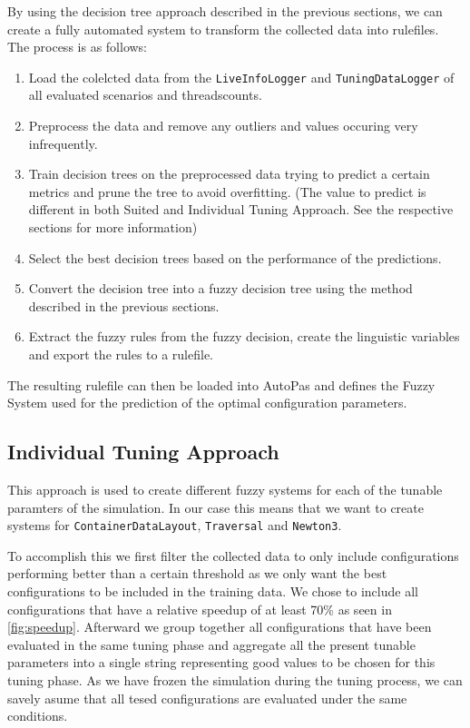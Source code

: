 By using the decision tree approach described in the previous sections, we can create a fully automated system to transform the collected data into rulefiles. The process is as follows:

\begin{enumerate}
    \item Load the colelcted data from the \texttt{LiveInfoLogger} and \texttt{TuningDataLogger} of all evaluated scenarios and threadscounts.
    \item Preprocess the data and remove any outliers and values occuring very infrequently.
    \item Train decision trees on the preprocessed data trying to predict a certain metrics and prune the tree to avoid overfitting. (The value to predict is different in both Suited and Individual Tuning Approach. See the respective sections for more information)
    \item Select the best decision trees based on the performance of the predictions.
    \item Convert the decision tree into a fuzzy decision tree using the method described in the previous sections.
    \item Extract the fuzzy rules from the fuzzy decision, create the linguistic variables and export the rules to a rulefile.
\end{enumerate}

The resulting rulefile can then be loaded into AutoPas and defines the Fuzzy System used for the prediction of the optimal configuration parameters.

\subsection{Individual Tuning Approach}

This approach is used to create different fuzzy systems for each of the tunable paramters of the simulation. In our case this means that we want to create systems for \texttt{ContainerDataLayout}, \texttt{Traversal} and \texttt{Newton3}.

To accomplish this we first filter the collected data to only include configurations performing better than a certain threshold as we only want the best configurations to be included in the training data. We chose to include all configurations that have a relative speedup of at least 70\% as seen in \autoref{fig:speedup}. Afterward we group together all configurations that have been evaluated in the same tuning phase and aggregate all the present tunable parameters into a single string representing good values to be chosen for this tuning phase. As we have frozen the simulation during the tuning process, we can savely asume that all tesed configurations are evaluated under the same conditions.

